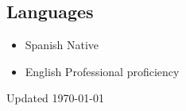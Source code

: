 \documentclass{academiccv}
\begin{document}
\subsection*{Languages}

\begin{itemize}
	
\item Spanish \tab Native
\item English \tab Professional proficiency 

\end{itemize}



\begin{center}
\vspace{6em}
Updated \monthyeardate\today
\end{center}
\end{document}
